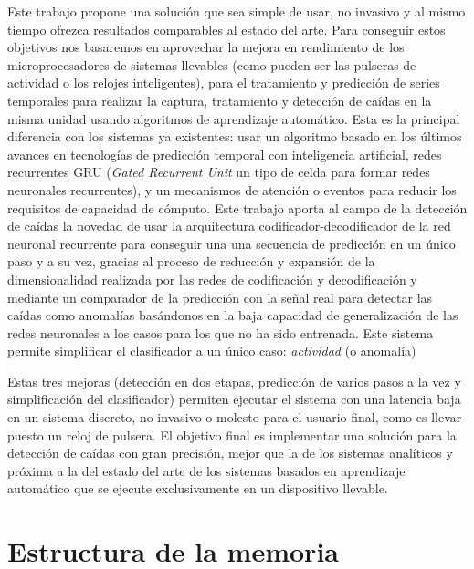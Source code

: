 Este trabajo propone una solución que sea simple de usar, no invasivo y al mismo tiempo ofrezca resultados comparables al estado del arte. Para conseguir estos objetivos nos basaremos en aprovechar la mejora en rendimiento de los microprocesadores de sistemas llevables (como pueden ser las pulseras de actividad o los relojes inteligentes), para el tratamiento y predicción de series temporales para realizar la captura, tratamiento y detección de caídas en la misma unidad usando algoritmos de aprendizaje automático. Esta es la principal diferencia con los sistemas ya existentes: usar un algoritmo basado en los últimos avances en tecnologías de predicción temporal con inteligencia artificial, redes recurrentes GRU (\textit{Gated Recurrent Unit} un tipo de celda para formar redes neuronales recurrentes),  y un mecanismos de atención o eventos para reducir los requisitos de capacidad de cómputo. Este trabajo aporta al campo de la detección de caídas la novedad de usar la arquitectura codificador-decodificador de la red neuronal recurrente para conseguir una una secuencia de predicción en un único paso y a su vez, gracias al proceso de reducción y expansión de la dimensionalidad realizada por las redes de codificación y decodificación y mediante un comparador de la predicción con la señal real para detectar las caídas como anomalías basándonos en la baja capacidad de generalización de las redes neuronales a los casos para los que no ha sido entrenada. Este sistema permite simplificar el clasificador a un único caso: \textit{actividad} (o anomalía)

Estas tres mejoras (detección en dos etapas, predicción de varios pasos a la vez y simplificación del clasificador) permiten ejecutar el sistema con una latencia baja en un sistema discreto, no invasivo o molesto para el usuario final, como es llevar puesto un reloj de pulsera. El objetivo final es implementar una solución para la detección de caídas con gran precisión, mejor que la de los sistemas analíticos y próxima a la del estado del arte de los sistemas basados en aprendizaje automático que se ejecute exclusivamente en un dispositivo llevable.

\section{Estructura de la memoria}\label{sec:intro:estructura}
\begin{comment}
qué hay en cada uno de los subsiguientes capítulos
\end{comment}

